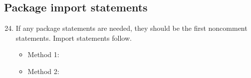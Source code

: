 \subsection{Package import statements}
\begin{enumerate}
\setcounter{enumi}{23}
	\item If any package statements are needed, they should be the first noncomment statements. Import statements follow.
	\begin{itemize}
	 	\item Method 1: \cmark
 		\item Method 2: 
	\end{itemize}	
\end{enumerate}